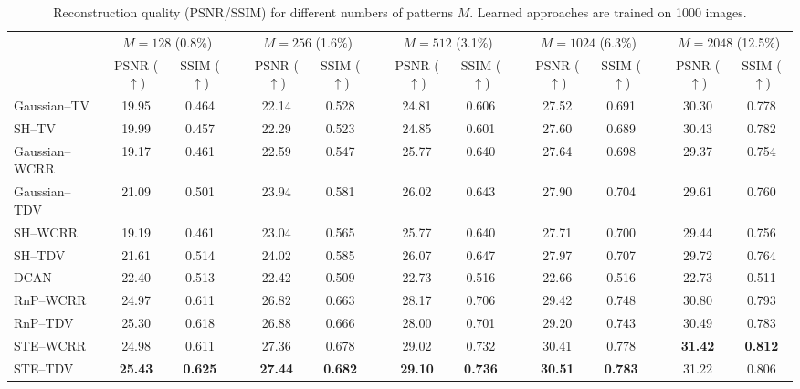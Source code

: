 \documentclass[lettersize,journal]{IEEEtran}
\begin{document}
\begin{table}[t]
\centering
\caption{Reconstruction quality (PSNR/SSIM) for different numbers of patterns $M$. Learned approaches are trained on \num{1000} images.}
\label{tab:psnr_ssim_grouped}
\setlength{\tabcolsep}{3pt}
\begin{tabular}{l cc c cc c cc c cc c cc}
\toprule
 & \multicolumn{2}{c}{$M=128$ (0.8\%)} & \hspace{8pt}
 & \multicolumn{2}{c}{$M=256$ (1.6\%)} & \hspace{8pt}
 & \multicolumn{2}{c}{$M=512$ (3.1\%)} & \hspace{8pt}
 & \multicolumn{2}{c}{$M=1024$ (6.3\%)} & \hspace{8pt}
 & \multicolumn{2}{c}{$M=2048$ (12.5\%)} \\
\cmidrule(lr){2-3} \cmidrule(lr){5-6} \cmidrule(lr){8-9} \cmidrule(lr){11-12} \cmidrule(lr){14-15} 
& PSNR ($\uparrow$) & SSIM ($\uparrow$) &
& PSNR ($\uparrow$) & SSIM ($\uparrow$) &
& PSNR ($\uparrow$) & SSIM ($\uparrow$) &
& PSNR ($\uparrow$) & SSIM ($\uparrow$) &
& PSNR ($\uparrow$) & SSIM ($\uparrow$)  \\
\midrule
Gaussian--TV    & 19.95 & 0.464 && 22.14 & 0.528 && 24.81 & 0.606 && 27.52 & 0.691 && 30.30 & 0.778 \\
SH--TV          & 19.99 & 0.457 && 22.29 & 0.523 && 24.85 & 0.601 && 27.60 & 0.689 && 30.43 & 0.782 \\
\midrule
Gaussian--WCRR  & 19.17 & 0.461 && 22.59 & 0.547 && 25.77 & 0.640 && 27.64 & 0.698 && 29.37 & 0.754 \\
Gaussian--TDV   & 21.09 & 0.501 && 23.94 & 0.581 && 26.02 & 0.643 && 27.90 & 0.704 && 29.61 & 0.760 \\
SH--WCRR        & 19.19 & 0.461 && 23.04 & 0.565 && 25.77 & 0.640 && 27.71 & 0.700 && 29.44 & 0.756 \\
SH--TDV         & 21.61 & 0.514 && 24.02 & 0.585 && 26.07 & 0.647 && 27.97 & 0.707 && 29.72 & 0.764 \\
\midrule
DCAN            & 22.40 & 0.513 && 22.42 & 0.509 && 22.73 & 0.516 && 22.66 & 0.516 && 22.73 & 0.511 \\
\midrule
RnP--WCRR       & 24.97 & 0.611 && 26.82 & 0.663 && 28.17 & 0.706 && 29.42 & 0.748 && 30.80 & 0.793 \\
RnP--TDV        & 25.30 & 0.618 && 26.88 & 0.666 && 28.00 & 0.701 && 29.20 & 0.743 && 30.49 & 0.783 \\
STE--WCRR       & 24.98 & 0.611 && 27.36 & 0.678 && 29.02 & 0.732 && 30.41 & 0.778 && \bf{31.42} & \bf{0.812} \\
STE--TDV        & \bf{25.43} & \bf{0.625} && \bf{27.44} & \bf{0.682} && \bf{29.10} & \bf{0.736} && \bf{30.51} & \bf{0.783} && 31.22 & 0.806 \\
\bottomrule
\end{tabular}
\end{table}
\end{document}
